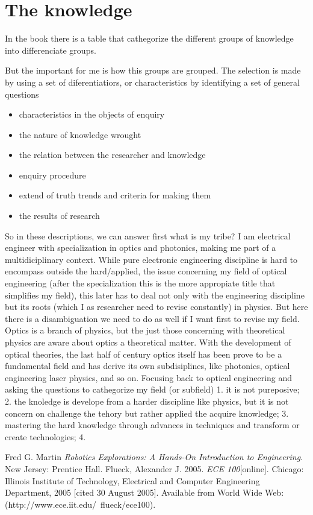 \documentclass[a4paper, 11pt]{article}
\begin{document}
\section*{The knowledge}
In the book there is a table that cathegorize the different groups of knowledge into differenciate groups. 

But the important for me is how this groups are grouped. The selection is made by using a set of diferentiatiors, or characteristics by identifying a set of general questions
	\begin{itemize}
		\item characteristics in the objects of enquiry
		\item the nature of knowledge wrought
		\item the relation between the researcher and knowledge
		\item enquiry procedure
		\item extend of truth trends and criteria for making them
		\item the results of research
\end{itemize}	
So in these descriptions, we can answer first what is my tribe? I am electrical engineer with specialization in optics and photonics, making me part of a multidiciplinary context. While pure electronic engineering discipline is hard to encompass outside the hard/applied, the issue concerning my field of optical engineering (after the specialization this is the more appropiate title that simplifies my field), this later has to deal not only with the engineering discipline but its roots (which I as researcher need to revise constantly) in physics. But here there is a disambiguation we need to do as well if I want first to revise my field. Optics is a branch of physics, but the just those concerning with theoretical physics are aware about optics a theoretical matter. With the development of optical theories, the last half of century optics itself has been prove to be a fundamental field and has derive its own subdisiplines, like photonics, optical engineering laser physics, and so on. Focusing back to optical engineering and asking the questions to cathegorize my field (or subfield) 1. it is not pureposive; 2. the knoledge is develope from a harder discipline like physics, but it is not concern on challenge the tehory but rather applied the acquire knowledge; 3. mastering the hard knowledge through advances in techniques and transform or create technologies; 4. 
\begin{thebibliography}{9}
 Fred G. Martin \emph{Robotics Explorations: A Hands-On Introduction to Engineering}. New Jersey: Prentice Hall.
  Flueck, Alexander J. 2005. \emph{ECE 100}[online]. Chicago: Illinois Institute of Technology, Electrical and Computer Engineering Department, 2005 [cited 30
August 2005]. Available from World Wide Web: (http://www.ece.iit.edu/~flueck/ece100).
\end{thebibliography}
\end{document}
